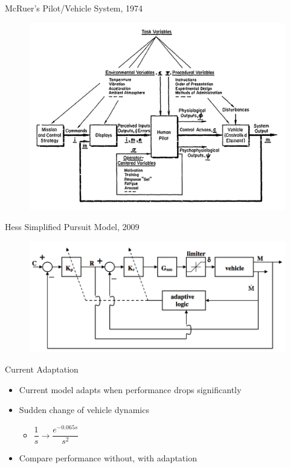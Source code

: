 \documentclass[10pt]{beamer}
\begin{document}
\begin{frame}[fragile]{McRuer's Pilot/Vehicle System, 1974~\cite{McRuer1974}}
  \begin{figure}[h!]
    \begin{center}
      \includegraphics[width=\linewidth]{../img/Screen_Shot_2018-07-25_at_10.37.08_AM.png}
    \end{center}
  \end{figure}
\end{frame}

\begin{frame}[fragile]{Hess Simplified Pursuit Model, 2009~\cite{Hess2009}}
  \begin{figure}[h!]
    \begin{center}
      \includegraphics[width=\linewidth]{./../img/Screen_Shot_2018-08-09_at_4.15.24_PM.png}
    \end{center}
  \end{figure}
\end{frame}

\begin{frame}[fragile]{Current Adaptation}
  \begin{itemize}
    \setlength\itemsep{1em}
    \item Current model adapts when performance drops significantly
    \item Sudden change of vehicle dynamics
    \begin{itemize}
      \item $\dfrac{1}{s} \rightarrow \dfrac{e^{-0.065s}}{s^2}$
    \end{itemize}
    \item Compare performance without, with adaptation
  \end{itemize}
\end{frame}
\end{document}
